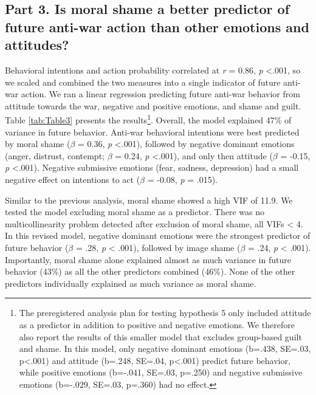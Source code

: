 \documentclass[
]{article}
\begin{document}
\subsection*{Part 3. Is moral shame a better predictor of future anti-war action than other emotions and attitudes?}\label{part-3.-is-moral-shame-a-better-predictor-of-future-anti-war-action-than-other-emotions-and-attitudes}

Behavioral intentions and action probability correlated at \emph{r} = 0.86, \emph{p} \textless.001, so we scaled and combined the two measures into a single indicator of future anti-war action. We ran a linear regression predicting future anti-war behavior from attitude towards the war, negative and positive emotions, and shame and guilt. Table \ref{tab:Table3} presents the results\footnote{The preregistered analysis plan for testing hypothesis 5 only included attitude as a predictor in addition to positive and negative emotions. We therefore also report the results of this smaller model that excludes group-based guilt and shame. In this model, only negative dominant emotions (b=.438, SE=.03, p\textless.001) and attitude (b=.248, SE=.04, p\textless.001) predict future behavior, while positive emotions (b=-.041, SE=.03, p=.250) and negative submissive emotions (b=-.029, SE=.03, p=.360) had no effect.}. Overall, the model explained 47\% of variance in future behavior. Anti-war behavioral intentions were best predicted by moral shame (\(\beta\) = 0.36, \emph{p} \textless.001), followed by negative dominant emotions (anger, distrust, contempt; \(\beta\) = 0.24, \emph{p} \textless.001), and only then attitude (\(\beta\) = -0.15, \emph{p} \textless.001). Negative submissive emotions (fear, sadness, depression) had a small negative effect on intentions to act (\(\beta\) = -0.08, \emph{p} = .015).

Similar to the previous analysis, moral shame showed a high VIF of 11.9. We tested the model excluding moral shame as a predictor. There was no multicollinearity problem detected after exclusion of moral shame, all VIFs \textless{} 4. In this revised model, negative dominant emotions were the strongest predictor of future behavior (\(\beta\) = .28, \emph{p} \textless{} .001), followed by image shame (\(\beta\) = .24, \emph{p} \textless{} .001). Importantly, moral shame alone explained almost as much variance in future behavior (43\%) as all the other predictors combined (46\%). None of the other predictors individually explained as much variance as moral shame.
\end{document}

